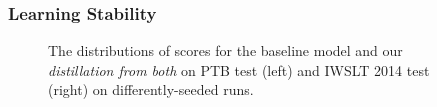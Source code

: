 %
%
%
%


\subsubsection{Learning Stability}
\begin{figure}[t]
	\centering
	\caption{The distributions of scores for the baseline model and
		our {\it distillation from both} on PTB test (left) and IWSLT 2014 test (right)
		on differently-seeded runs.
	}\label{fig:stable}
\end{figure}

